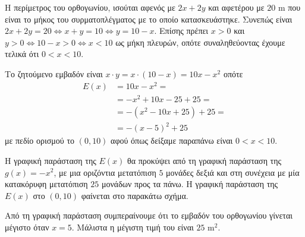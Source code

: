 \begin{alist}
\item Η περίμετρος του ορθογωνίου, ισούται αφενός με $2x+2y$ και αφετέρου με $20\text{ m}$ που είναι το μήκος του συρματοπλέγματος με το οποίο κατασκευάστηκε. Συνεπώς είναι $2x+2y = 20 \Leftrightarrow x+y = 10 \Leftrightarrow y = 10-x$. Επίσης πρέπει $x>0$ και $y>0 \Leftrightarrow 10-x>0 \Leftrightarrow x<10$ ως μήκη πλευρών, οπότε συναληθεύοντας έχουμε τελικά ότι $0<x<10$.
\item Το ζητούμενο εμβαδόν είναι $x \cdot y = x \cdot (10-x) = 10x - x^2$ οπότε
\begin{align*}
E(x) &= 10x - x^2 = \\
&= -x^2 + 10x - 25 + 25 = \\
&= -(x^2 - 10x + 25) + 25 = \\
&= -(x-5)^2 + 25
\end{align*}
με πεδίο ορισμού το $(0, 10)$ αφού όπως δείξαμε παραπάνω είναι $0 < x < 10$.
\item Η γραφική παράσταση της $E(x)$ θα προκύψει από τη γραφική παράσταση της $g(x) = -x^2$, με μια οριζόντια μετατόπιση $5$ μονάδες δεξιά και στη συνέχεια με μία κατακόρυφη μετατόπιση $25$ μονάδων προς τα πάνω. Η γραφική παράσταση της $E(x)$ στο $(0, 10)$ φαίνεται στο παρακάτω σχήμα.
\begin{center}
\end{center}
Από τη γραφική παράσταση συμπεραίνουμε ότι το εμβαδόν του ορθογωνίου γίνεται μέγιστο όταν $x = 5$. Μάλιστα η μέγιστη τιμή του είναι $25\text{ m}^2$.
\end{alist}

